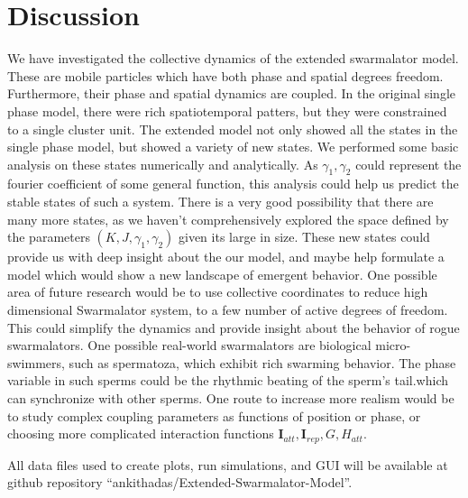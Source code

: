 \documentclass[superscriptaddress,reprint,amssymb, amsmath,aps, pre]{revtex4-1}
\begin{document}
\section{Discussion}
{
    We have investigated the collective dynamics of the extended swarmalator model. These are mobile particles which have both phase and spatial degrees freedom. Furthermore, their phase and spatial dynamics are coupled. In the original single phase model, there were rich spatiotemporal patters, but they were constrained to a single cluster unit. The extended model not only showed all the states in the single phase model, but showed a variety of new states. We performed some basic analysis on these states numerically and analytically. As \(\gamma_1, \gamma_2\) could represent the fourier coefficient of some general function, this analysis could help us predict the stable states of such a system. There is a very good possibility that there are many more states, as we haven't comprehensively explored the space defined by the parameters \((K,J,\gamma_1,\gamma_2)\) given its large in size. These new states could provide us with deep insight about the our model, and maybe help formulate a model which would show a new landscape of emergent behavior. One possible area of future research would be to use collective coordinates to reduce high dimensional Swarmalator system, to a few number of active degrees of freedom. This could simplify the dynamics and provide insight about the behavior of rogue swarmalators. One possible real-world swarmalators are biological micro-swimmers, such as spermatoza, which exhibit rich swarming behavior. The phase variable in such sperms could be the rhythmic beating of the sperm's tail.which can synchronize with other sperms. One route to increase more realism would be to study complex coupling parameters as functions of position or phase, or choosing more complicated interaction functions \(\mathbf{I}_{att},\mathbf{I}_{rep},G,H_{att}\).

    All data files used to create plots, run simulations, and GUI will be available at github repository ``ankithadas/Extended-Swarmalator-Model''. 
}



\end{document}
